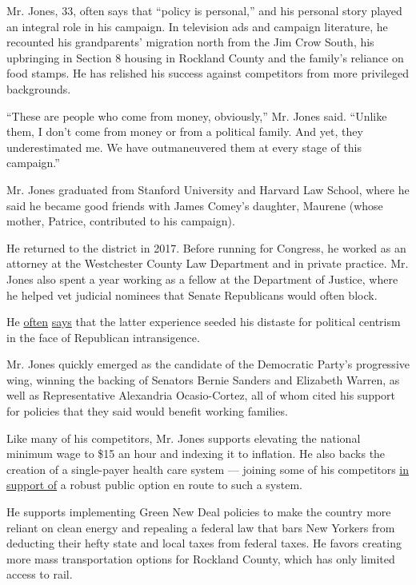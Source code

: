 Mr. Jones, 33, often says that ``policy is personal,'' and his personal
story played an integral role in his campaign. In television ads and
campaign literature, he recounted his grandparents' migration north from
the Jim Crow South, his upbringing in Section 8 housing in Rockland
County and the family's reliance on food stamps. He has relished his
success against competitors from more privileged backgrounds.

``These are people who come from money, obviously,'' Mr. Jones said.
``Unlike them, I don't come from money or from a political family. And
yet, they underestimated me. We have outmaneuvered them at every stage
of this campaign.''

Mr. Jones graduated from Stanford University and Harvard Law School,
where he said he became good friends with James Comey's daughter,
Maurene (whose mother, Patrice, contributed to his campaign).

He returned to the district in 2017. Before running for Congress, he
worked as an attorney at the Westchester County Law Department and in
private practice. Mr. Jones also spent a year working as a fellow at the
Department of Justice, where he helped vet judicial nominees that Senate
Republicans would often block.

He
\href{https://www.nbcnews.com/feature/nbc-out/meet-new-yorker-who-hopes-be-america-s-first-black-n1085706}{often}
\href{http://www.mtv.com/news/3150060/mondaire-jones-could-be-the-first-black-openly-gay-member-of-congress/}{says}
that the latter experience seeded his distaste for political centrism in
the face of Republican intransigence.

Mr. Jones quickly emerged as the candidate of the Democratic Party's
progressive wing, winning the backing of Senators Bernie Sanders and
Elizabeth Warren, as well as Representative Alexandria Ocasio-Cortez,
all of whom cited his support for policies that they said would benefit
working families.

Like many of his competitors, Mr. Jones supports elevating the national
minimum wage to \$15 an hour and indexing it to inflation. He also backs
the creation of a single-payer health care system --- joining some of
his competitors
\href{https://www.youtube.com/watch?v=YrkWqdGT8eA\&feature=youtu.be}{in
support of} a robust public option en route to such a system.

He supports implementing Green New Deal policies to make the country
more reliant on clean energy and repealing a federal law that bars New
Yorkers from deducting their hefty state and local taxes from federal
taxes. He favors creating more mass transportation options for Rockland
County, which has only limited access to rail.

